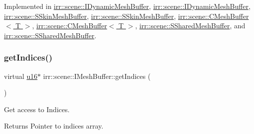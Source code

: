 Implemented in \hyperlink{classirr_1_1scene_1_1IDynamicMeshBuffer_ab762d23eb5666125dad83ce20f15b4dd}{irr\+::scene\+::\+I\+Dynamic\+Mesh\+Buffer}, \hyperlink{classirr_1_1scene_1_1IDynamicMeshBuffer_ab762d23eb5666125dad83ce20f15b4dd}{irr\+::scene\+::\+I\+Dynamic\+Mesh\+Buffer}, \hyperlink{structirr_1_1scene_1_1SSkinMeshBuffer_ac5f16b3fca6454afe01939a2c1e23d08}{irr\+::scene\+::\+S\+Skin\+Mesh\+Buffer}, \hyperlink{structirr_1_1scene_1_1SSkinMeshBuffer_ac5f16b3fca6454afe01939a2c1e23d08}{irr\+::scene\+::\+S\+Skin\+Mesh\+Buffer}, \hyperlink{classirr_1_1scene_1_1CMeshBuffer_a23af7e8ffb2ba674d1dd4448cea288bf}{irr\+::scene\+::\+C\+Mesh\+Buffer$<$ T $>$}, \hyperlink{classirr_1_1scene_1_1CMeshBuffer_a23af7e8ffb2ba674d1dd4448cea288bf}{irr\+::scene\+::\+C\+Mesh\+Buffer$<$ T $>$}, \hyperlink{structirr_1_1scene_1_1SSharedMeshBuffer_a3ddd96966e9bbb409536dd8951018b69}{irr\+::scene\+::\+S\+Shared\+Mesh\+Buffer}, and \hyperlink{structirr_1_1scene_1_1SSharedMeshBuffer_a3ddd96966e9bbb409536dd8951018b69}{irr\+::scene\+::\+S\+Shared\+Mesh\+Buffer}.

\mbox{\label{classirr_1_1scene_1_1IMeshBuffer_a3d33a561023314677361e30cf07ae429}} 
\subsubsection{\texorpdfstring{get\+Indices()}{getIndices()}\hspace{0.1cm}{\footnotesize\ttfamily [3/4]}}
{\footnotesize\ttfamily virtual \hyperlink{namespaceirr_ae9f8ec82692ad3b83c21f555bfa70bcc}{u16}$\ast$ irr\+::scene\+::\+I\+Mesh\+Buffer\+::get\+Indices (\begin{DoxyParamCaption}{ }\end{DoxyParamCaption})\hspace{0.3cm}{\ttfamily [pure virtual]}}



Get access to Indices. 

\begin{DoxyReturn}{Returns}
Pointer to indices array. 
\end{DoxyReturn}


